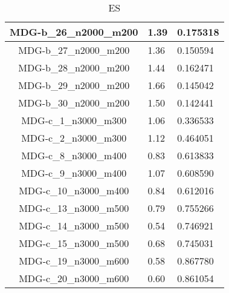 \documentclass[10pt,a4paper]{article}
\begin{document}
\begin{table}[]
\begin{tabular}{|c|l|l|}
		MDG-b\_26\_n2000\_m200 & 1.39                               & 0.175318                             \\ \hline
		MDG-b\_27\_n2000\_m200 & 1.36                               & 0.150594                             \\ \hline
		MDG-b\_28\_n2000\_m200 & 1.44                               & 0.162471                             \\ \hline
		MDG-b\_29\_n2000\_m200 & 1.66                               & 0.145042                             \\ \hline
		MDG-b\_30\_n2000\_m200 & 1.50                               & 0.142441                             \\ \hline
		MDG-c\_1\_n3000\_m300  & 1.06                               & 0.336533                             \\ \hline
		MDG-c\_2\_n3000\_m300  & 1.12                               & 0.464051                             \\ \hline
		MDG-c\_8\_n3000\_m400  & 0.83                               & 0.613833                             \\ \hline
		MDG-c\_9\_n3000\_m400  & 1.07                               & 0.608590                             \\ \hline
		MDG-c\_10\_n3000\_m400 & 0.84                               & 0.612016                             \\ \hline
		MDG-c\_13\_n3000\_m500 & 0.79                               & 0.755266                             \\ \hline
		MDG-c\_14\_n3000\_m500 & 0.54                               & 0.746921                             \\ \hline
		MDG-c\_15\_n3000\_m500 & 0.68                               & 0.745031                             \\ \hline
		MDG-c\_19\_n3000\_m600 & 0.58                               & 0.867780                             \\ \hline
		MDG-c\_20\_n3000\_m600 & 0.60                               & 0.861054                             \\ \hline
	\end{tabular}
	\caption{ES}
	\label{table:ES}
\end{table}
\end{document}
